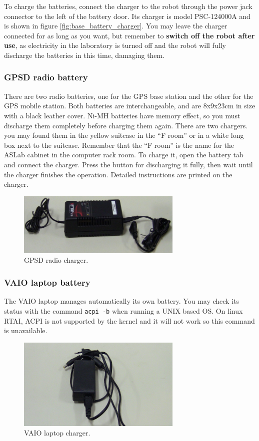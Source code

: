To charge the batteries, connect the charger to the robot through the power jack connector to the
left of the battery door. Its charger is model PSC-124000A and is shown in figure \ref{fig:base_battery_charger}. You may leave the charger connected
for as long as you want, but remember to \textbf{switch off the robot after use}, as electricity in the
laboratory is turned off and the robot will fully discharge the batteries in this time, damaging them.

\subsubsection{GPSD radio battery}
There are two radio batteries, one for the GPS base station and the other for the GPS mobile station. Both batteries
are interchangeable, and are 8x9x23cm in size with a black leather cover.
Ni-MH batteries have memory effect, so you must discharge them completely before charging them again.
There are two chargers. you may found them in the yellow suitcase in the ``F room'' or in a white long box next to
the suitcase. Remember that the ``F room'' is the name for the ASLab cabinet in the computer rack room.
To charge it, open the battery tab and connect the charger. Press the button for discharging it fully, then wait until the
charger finishes the operation. Detailed instructions are printed on the charger. 

\begin{figure}[ht]
\centering
 \includegraphics[width=0.7\textwidth]{figures/device_photos/gps_charger.jpg}
\caption{GPSD radio charger.}
\end{figure}

\subsubsection{VAIO laptop battery}
The VAIO laptop manages automatically its own battery. You may check its status with the command
\texttt{acpi -b} when running a UNIX based OS. On linux RTAI, ACPI is not supported by the kernel and it will not work so this command
is unavailable.

\begin{figure}[ht]
\centering
 \includegraphics[width=0.7\textwidth]{figures/device_photos/vaio_charger.jpg}
\caption{VAIO laptop charger.}
\end{figure}


